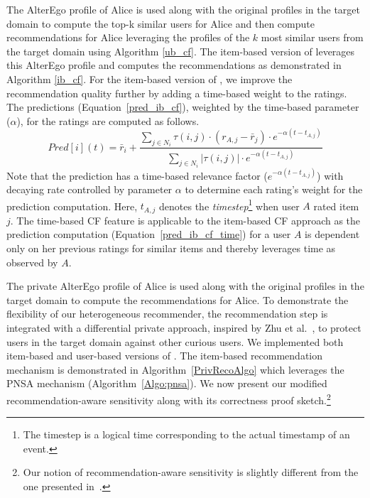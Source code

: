  The AlterEgo profile of Alice is used along with the original profiles in the target domain to compute the top-k similar users for Alice and then compute recommendations for Alice leveraging the profiles of the $k$ most similar users from the target domain using Algorithm \ref{ub_cf}. The item-based version of \crossrec leverages this AlterEgo profile and computes the recommendations as demonstrated in Algorithm \ref{ib_cf}. For the item-based version of \crossrec, we improve the recommendation quality further by adding a time-based weight to the ratings. The predictions (Equation~\ref{pred_ib_cf}), weighted by the time-based parameter ($\alpha$), for the ratings are computed as follows.
\begin{equation}
\label{pred_ib_cf_time}
Pred[i] (t)=\bar{r}_{i} +\frac{\sum_{j \in N_{i}} \tau(i,j) \cdot (r_{A,j}- \bar{r}_j) \cdot e^{-\alpha (t-t_{A,j})}}{\sum_{j \in N_{i}} |\tau(i,j)| \cdot e^{-\alpha (t-t_{A,j})} } 
\end{equation}
Note that the prediction has a time-based relevance factor ($e^{-\alpha (t-t_{A,j})}$) with decaying rate controlled by parameter $\alpha$ to determine each rating's weight for the prediction computation. Here, $t_{A,j}$ denotes the \emph{timestep}\footnote{The timestep is a logical time corresponding to the actual timestamp of an event.} when user $A$ rated item $j$. The time-based CF feature is applicable to the item-based CF approach as the prediction computation (Equation~\ref{pred_ib_cf_time}) for a user $A$ is dependent only on her previous ratings for similar items and thereby leverages time as observed by $A$.

The private AlterEgo profile of Alice is used along with the original profiles in the target domain to compute the recommendations for Alice. To demonstrate the flexibility of our heterogeneous recommender, the recommendation step is integrated with a differential private approach, inspired by Zhu et al.~\cite{zhu2013differential,zhu2014effective}, to protect users in the target domain against other curious users. We implemented both item-based and user-based versions of \crossrec. The item-based recommendation mechanism is demonstrated in Algorithm~\ref{PrivRecoAlgo} which leverages the PNSA mechanism (Algorithm~\ref{Algo:pnsa}). We now present our modified recommendation-aware sensitivity along with its correctness proof sketch.\footnote{Our notion of recommendation-aware sensitivity is slightly different from the one presented in~\cite{zhu2013differential,zhu2014effective}.}

